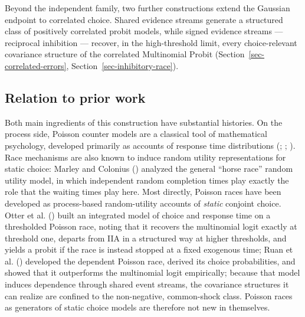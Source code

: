 \documentclass[
  man,
  floatsintext,
  longtable,
  a4paper,
  nolmodern,
  notxfonts,
  notimes,
  colorlinks=true,linkcolor=blue,citecolor=blue,urlcolor=blue]{apa7}
\begin{document}
Beyond the independent family, two further constructions extend the
Gaussian endpoint to correlated choice. Shared evidence streams generate
a structured class of positively correlated probit models, while signed
evidence streams --- reciprocal inhibition --- recover, in the
high-threshold limit, every choice-relevant covariance structure of the
correlated Multinomial Probit (Section~\ref{sec-correlated-errors},
Section~\ref{sec-inhibitory-race}).

\subsection*{Relation to prior work}\label{relation-to-prior-work}

Both main ingredients of this construction have substantial histories.
On the process side, Poisson counter models are a classical tool of
mathematical psychology, developed primarily as accounts of response
time distributions (; ;
). Race mechanisms are also known to induce random utility
representations for static choice: Marley and Colonius
() analyzed the general
``horse race'' random utility model, in which independent random
completion times play exactly the role that the waiting times play here.
Most directly, Poisson races have been developed as process-based
random-utility accounts of \emph{static} conjoint choice. Otter et al.
() built an
integrated model of choice and response time on a thresholded Poisson
race, noting that it recovers the multinomial logit exactly at threshold
one, departs from IIA in a structured way at higher thresholds, and
yields a probit if the race is instead stopped at a fixed exogenous
time; Ruan et al. ()
developed the dependent Poisson race, derived its choice probabilities,
and showed that it outperforms the multinomial logit empirically;
because that model induces dependence through shared event streams, the
covariance structures it can realize are confined to the non-negative,
common-shock class. Poisson races as generators of static choice models
are therefore not new in themselves.
\end{document}
